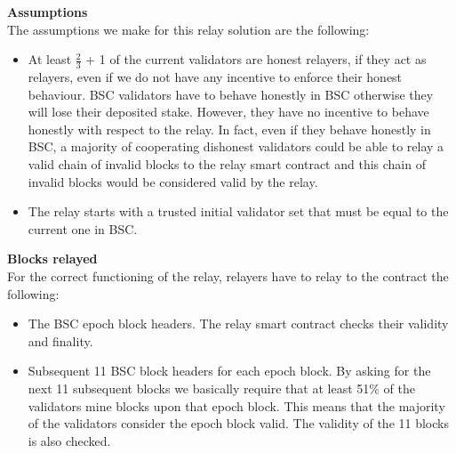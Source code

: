 \noindent
\textbf{Assumptions}\\
The assumptions we make for this relay solution are the following: 
\begin{itemize}
\item At least $\frac{2}{3}$ + 1 of the current validators are honest relayers, if they act as relayers, even if we do not have any incentive to enforce their honest behaviour. BSC validators have to behave honestly in BSC otherwise they will lose their deposited stake. However, they have no incentive to behave honestly with respect to the relay. In fact, even if they behave honestly in BSC, a majority of cooperating dishonest validators could be able to relay a valid chain of invalid blocks to the relay smart contract and this chain of invalid blocks would be considered valid by the relay. 
\item The relay starts with a trusted initial validator set that must be equal to the current one in BSC.
\end{itemize}
\noindent
\textbf{Blocks relayed}\\
For the correct functioning of the relay, relayers have to relay to the contract the following:  
\begin{itemize}
    \item The BSC epoch block headers. The relay smart contract checks their validity and finality.%
    \item Subsequent 11 BSC block headers for each epoch block. By asking for the next 11 subsequent blocks we basically require that at least 51\% of the validators mine blocks upon that epoch block. This means that the majority of the validators consider the epoch block valid. The validity of the 11 blocks is also checked.
\end{itemize}
